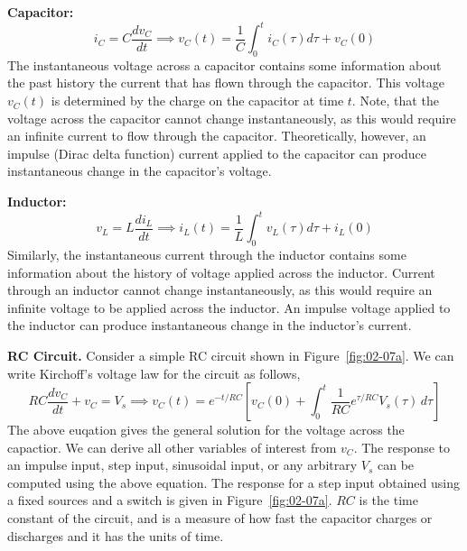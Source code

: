 \noindent\textbf{Capacitor:}
\begin{equation}
    i_C = C \frac{dv_C}{dt} \implies v_C\left(t\right) = \frac{1}{C}\int_{0}^{t} i_C\left(\tau\right) d\tau + v_C\left(0\right)
    \label{eq:02-26}
\end{equation} 
The instantaneous voltage across a capacitor contains some information about the past history the current that has flown through the capacitor. This voltage $v_C\left(t\right)$ is determined by the charge on the capacitor at time $t$. Note, that the voltage across the capacitor cannot change instantaneously, as this would require an infinite current to flow through the capacitor. Theoretically, however, an impulse (Dirac delta function) current applied to the capacitor can produce instantaneous change in the capacitor's voltage.

\noindent\textbf{Inductor:}
\begin{equation}
    v_L = L \frac{di_L}{dt} \implies i_L\left(t\right) = \frac{1}{L}\int_{0}^{t} v_L\left(\tau\right) d\tau + i_L\left(0\right)
    \label{eq:02-27}
\end{equation}
Similarly, the instantaneous current through the inductor contains some information about the history of voltage applied across the inductor. Current through an inductor cannot change instantaneously, as this would require an infinite voltage to be applied across the inductor. An impulse voltage applied to the inductor can produce instantaneous change in the inductor's current.

\noindent\textbf{RC Circuit.} Consider a simple RC circuit shown in Figure~\ref{fig:02-07a}. We can write Kirchoff's voltage law for the circuit as follows,
\begin{equation}
    RC \frac{d v_C}{dt} + v_C = V_s \implies v_C(t) = e^{-t/RC} \left[ v_{C}(0) + \int_0^t \frac{1}{RC} e^{\tau/RC} V_s(\tau)\, d\tau \right]
    \label{eq:02-28}
\end{equation}
The above euqation gives the general solution for the voltage across the capactior. We can derive all other variables of interest from $v_C$. The response to an impulse input, step input, sinusoidal input, or any arbitrary $V_s$ can be computed using the above equation. The response for a step input obtained using a fixed sources and a switch is given in Figure~\ref{fig:02-07a}. $RC$ is the time constant of the circuit, and is a measure of how fast the capacitor charges or discharges and it has the units of time.


